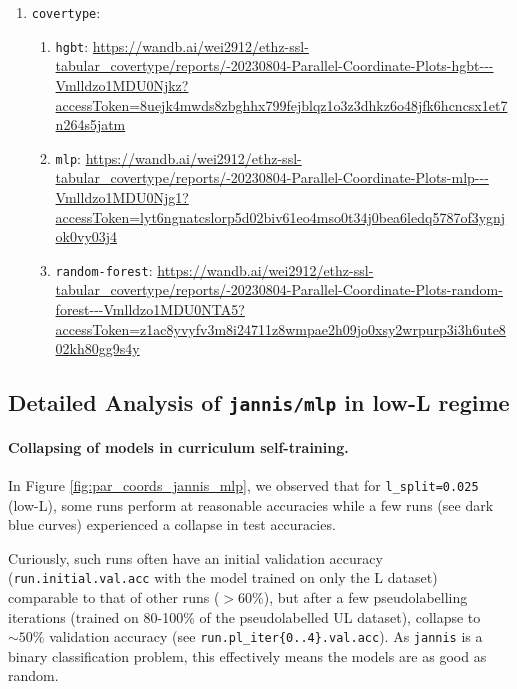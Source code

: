 \documentclass{article}
\begin{document}
{\begin{enumerate}
\begin{enumerate}
      \item \texttt{random-forest}: \url{https://api.wandb.ai/links/wei2912/kcp3hgny}
    \end{enumerate}
    \item \texttt{covertype}: \begin{enumerate}
      \item \texttt{hgbt}: \url{https://wandb.ai/wei2912/ethz-ssl-tabular_covertype/reports/-20230804-Parallel-Coordinate-Plots-hgbt---Vmlldzo1MDU0Njkz?accessToken=8uejk4mwds8zbghhx799fejblqz1o3z3dhkz6o48jfk6hcncsx1et7n264s5jatm}
      \item \texttt{mlp}: \url{https://wandb.ai/wei2912/ethz-ssl-tabular_covertype/reports/-20230804-Parallel-Coordinate-Plots-mlp---Vmlldzo1MDU0Njg1?accessToken=lyt6ngnatcslorp5d02biv61eo4mso0t34j0bea6ledq5787of3ygnjok0vy03j4}
      \item \texttt{random-forest}: \url{https://wandb.ai/wei2912/ethz-ssl-tabular_covertype/reports/-20230804-Parallel-Coordinate-Plots-random-forest---Vmlldzo1MDU0NTA5?accessToken=z1ac8yvyfv3m8i24711z8wmpae2h09jo0xsy2wrpurp3i3h6ute802kh80gg9s4y}
    \end{enumerate}
  \end{enumerate}
}

\clearpage
\subsection{Detailed Analysis of \texttt{jannis/mlp} in low-L regime}
\label{sec:det_anal_jannis_mlp}

\paragraph{Collapsing of models in curriculum self-training.}
In Figure \ref{fig:par_coords_jannis_mlp}, we observed that for \texttt{l\_split=0.025}
(low-L), some runs perform at reasonable accuracies while a few runs (see dark blue
curves) experienced a collapse in test accuracies.

Curiously, such runs often have an initial validation accuracy
(\texttt{run.initial.val.acc} with the model trained on only the L dataset) comparable
to that of other runs ($> 60\%$), but after a few pseudolabelling iterations (trained on
80-100\% of the pseudolabelled UL dataset), collapse to $\sim 50\%$ validation accuracy
(see \texttt{run.pl\_iter\{0..4\}.val.acc}).
As \texttt{jannis} is a binary classification problem, this effectively means the models
are as good as random.
\end{document}
